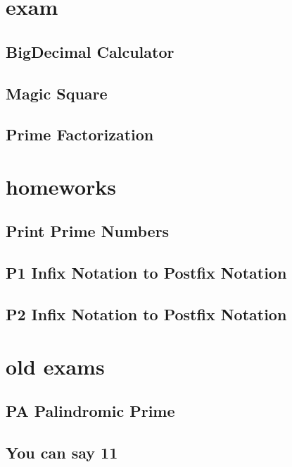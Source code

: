 \section{exam}
    \subsection{BigDecimal Calculator}
            
    \subsection{Magic Square}
        
    \subsection{Prime Factorization}
        

\section{homeworks}
    \subsection{Print Prime Numbers}
            
    \subsection{P1 Infix Notation to Postfix Notation}
             
    \subsection{P2 Infix Notation to Postfix Notation}
        

\section{old exams}
    \subsection{PA Palindromic Prime}
            
    \subsection{You can say 11}
        
